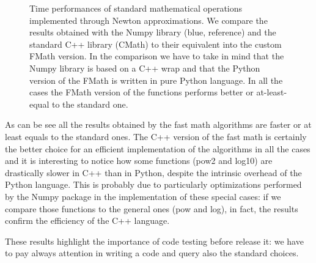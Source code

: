 \documentclass{standalone}
\begin{document}
\begin{figure}[htbp]
\centering
\def\svgwidth{0.8\textwidth}

\caption{Time performances of standard mathematical operations implemented through Newton approximations.
We compare the results obtained with the Numpy library (blue, reference) and the standard C++ library (\textsf{CMath}) to their equivalent into the custom \textsf{FMath} version.
In the comparison we have to take in mind that the Numpy library is based on a C++ wrap and that the Python version of the \textsf{FMath} is written in pure Python language.
In all the cases the \textsf{FMath} version of the functions performs better or at-least-equal to the standard one.
}
\label{fig:fmath}
\end{figure}

As can be see all the results obtained by the \textsf{fast math} algorithms are faster or at least equals to the standard ones.
The C++ version of the \textsf{fast math} is certainly the better choice for an efficient implementation of the algorithms in all the cases and it is interesting to notice how some functions (\textsf{pow2} and \textsf{log10}) are drastically slower in C++ than in Python, despite the intrinsic overhead of the Python language.
This is probably due to particularly optimizations performed by the Numpy package in the implementation of these special cases: if we compare those functions to the general ones (\textsf{pow} and \textsf{log}), in fact, the results confirm the efficiency of the C++ language.

These results highlight the importance of code testing before release it: we have to pay always attention in writing a code and query also the standard choices.
\end{document}
